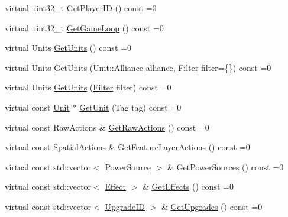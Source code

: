 \begin{DoxyCompactItemize}
\item 
virtual uint32\+\_\+t \hyperlink{classsc2_1_1_observation_interface_a21c3f197fe6578e63ef6b2eaa2be082c}{Get\+Player\+ID} () const =0
\item 
virtual uint32\+\_\+t \hyperlink{classsc2_1_1_observation_interface_a19d85546124654418d00b736f0146218}{Get\+Game\+Loop} () const =0
\item 
virtual Units \hyperlink{classsc2_1_1_observation_interface_adf2e86998034eed0c91b558848b68f44}{Get\+Units} () const =0
\item 
virtual Units \hyperlink{classsc2_1_1_observation_interface_aa43cfa17a9ac893500bce33eb41e6171}{Get\+Units} (\hyperlink{classsc2_1_1_unit_a5a40e672e7599d73ef8ef5758bbd7461}{Unit\+::\+Alliance} alliance, \hyperlink{sc2__interfaces_8h_a5cc3d9751182ccd2b085f3e272bcc88b}{Filter} filter=\{\}) const =0
\item 
virtual Units \hyperlink{classsc2_1_1_observation_interface_ab0d22edc6bd276b8e9d27387294fdc88}{Get\+Units} (\hyperlink{sc2__interfaces_8h_a5cc3d9751182ccd2b085f3e272bcc88b}{Filter} filter) const =0
\item 
virtual const \hyperlink{classsc2_1_1_unit}{Unit} $\ast$ \hyperlink{classsc2_1_1_observation_interface_a0f766e5a6522a6966b4d2abf0a2daff2}{Get\+Unit} (Tag tag) const =0
\item 
virtual const Raw\+Actions \& \hyperlink{classsc2_1_1_observation_interface_aa247d650d50d3d1bfe81642df96b1360}{Get\+Raw\+Actions} () const =0
\item 
virtual const \hyperlink{structsc2_1_1_spatial_actions}{Spatial\+Actions} \& \hyperlink{classsc2_1_1_observation_interface_a1e0b5b6e6e6ce0a879c1854b696dcdb0}{Get\+Feature\+Layer\+Actions} () const =0
\item 
virtual const std\+::vector$<$ \hyperlink{structsc2_1_1_power_source}{Power\+Source} $>$ \& \hyperlink{classsc2_1_1_observation_interface_abf25ada67444ace346e57c1ad367ca8e}{Get\+Power\+Sources} () const =0
\item 
virtual const std\+::vector$<$ \hyperlink{structsc2_1_1_effect}{Effect} $>$ \& \hyperlink{classsc2_1_1_observation_interface_a1c558b2b552f4132938afedc309f7295}{Get\+Effects} () const =0
\item 
virtual const std\+::vector$<$ \hyperlink{classsc2_1_1_s_c2_type}{Upgrade\+ID} $>$ \& \hyperlink{classsc2_1_1_observation_interface_a0a794661f0072921a75d4c5851cfb9e9}{Get\+Upgrades} () const =0
\item 

\end{DoxyCompactItemize}
